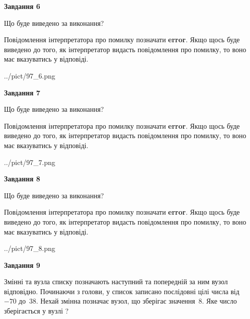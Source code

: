 \documentclass[12pt, ukrainian]{article}
\begin{document}
{\begin {large}
{\begin {center}\textbf{Завдання 6}\end {center}}\par
Що буде виведено за виконання?

Повідомлення інтерпретатора про помилку позначати \textbf{error}.
Якщо щось буде виведено до того, як інтерпретатор видасть повідомлення про помилку, 
то воно має вказуватись у відповіді. \par


\begin{center}
	{../pict/97_6.png}
\end{center}
\newpage

{\begin {center}\textbf{Завдання 7}\end {center}}\par
Що буде виведено за виконання?

Повідомлення інтерпретатора про помилку позначати \textbf{error}.
Якщо щось буде виведено до того, як інтерпретатор видасть повідомлення про помилку, 
то воно має вказуватись у відповіді. \par


\begin{center}
	{../pict/97_7.png}
\end{center}
\newpage

{\begin {center}\textbf{Завдання 8}\end {center}}\par
Що буде виведено за виконання?

Повідомлення інтерпретатора про помилку позначати \textbf{error}.
Якщо щось буде виведено до того, як інтерпретатор видасть повідомлення про помилку, 
то воно має вказуватись у відповіді. \par


\begin{center}
	{../pict/97_8.png}
\end{center}
\newpage

{\begin {center}\textbf{Завдання 9}\end {center}}\par
Змінні  та  вузла списку позначають наступний та попередній за ним вузол відповідно. Починаючи з голови, у список записано послідовні цілі числа від~$-70$ до~$38$. Нехай змінна  позначає вузол, що зберігає значення~$8$.
Яке число зберігається у вузлі  ?\par
\newpage


\end{large}}
\end{document}

